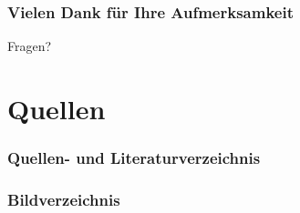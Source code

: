\begin{frame}
    \frametitle{Vielen Dank für Ihre Aufmerksamkeit}

    \begin{center}
        Fragen?
    \end{center}
\end{frame}

\section{Quellen}

\begin{frame}[allowframebreaks]
    \frametitle{Quellen- und Literaturverzeichnis}
    \printbibliography[heading=none, notkeyword={image}, notkeyword={online}]   
\end{frame}


\begin{frame}[allowframebreaks]
    \frametitle{Bildverzeichnis}
    \printbibliography[heading=none, keyword={image}]
\end{frame}